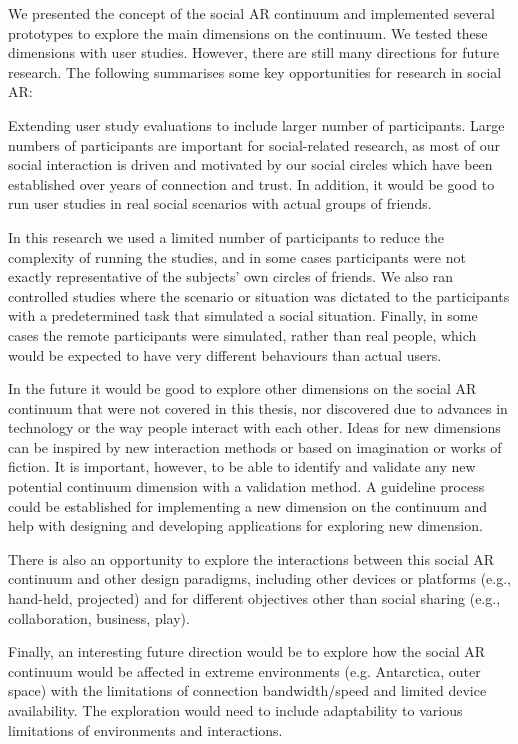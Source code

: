 We presented the concept of the social AR continuum and implemented several prototypes to explore the main dimensions on the continuum. We tested these dimensions with user studies. However, there are still many directions for future research. The following summarises some key opportunities for research in social AR:  

Extending user study evaluations to include larger number of participants. Large numbers of participants are important for social-related research, as most of our social interaction is driven and motivated by our social circles which have been established over years of connection and trust.  In addition, it would be good to run user studies in real social scenarios with actual groups of friends.

In this research we used a limited number of participants to reduce the complexity of running the studies, and in some cases participants were not exactly representative of the subjects' own circles of friends. We also ran controlled studies where the scenario or situation was dictated to the participants with a predetermined task that simulated a social situation. Finally, in some cases the remote participants were simulated, rather than real people, which would be expected to have very different behaviours than actual users.

In the future it would be good to explore other dimensions on the social AR continuum that were not covered in this thesis, nor discovered due to advances in technology or the way people interact with each other. Ideas for new dimensions can be inspired by new interaction methods or based on imagination or works of fiction. It is important, however, to be able to identify and validate any new potential continuum dimension with a validation method. A guideline process could be established for implementing a new dimension on the continuum and help with designing and developing applications for exploring new dimension. 

There is also an opportunity to explore the interactions between this social AR continuum and other design paradigms, including other devices or platforms (e.g., hand-held, projected) and for different objectives other than social sharing (e.g., collaboration, business, play).

Finally, an interesting future direction would be to explore how the social AR continuum would be affected in extreme environments (e.g. Antarctica, outer space) with the limitations of connection bandwidth/speed and limited device availability. The exploration would need to include adaptability to various limitations of environments and interactions. 


